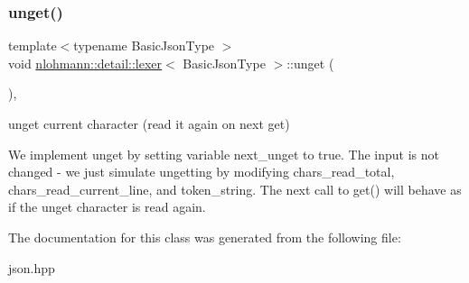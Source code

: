 \subsubsection{\texorpdfstring{unget()}{unget()}}
{\footnotesize\ttfamily template$<$typename Basic\+Json\+Type $>$ \\
void \mbox{\hyperlink{classnlohmann_1_1detail_1_1lexer}{nlohmann\+::detail\+::lexer}}$<$ Basic\+Json\+Type $>$\+::unget (\begin{DoxyParamCaption}{ }\end{DoxyParamCaption})\hspace{0.3cm}{\ttfamily [inline]}, {\ttfamily [private]}}



unget current character (read it again on next get) 

We implement unget by setting variable next\+\_\+unget to true. The input is not changed -\/ we just simulate ungetting by modifying chars\+\_\+read\+\_\+total, chars\+\_\+read\+\_\+current\+\_\+line, and token\+\_\+string. The next call to get() will behave as if the unget character is read again. 

The documentation for this class was generated from the following file\+:\begin{DoxyCompactItemize}
\item 
json.\+hpp\end{DoxyCompactItemize}
